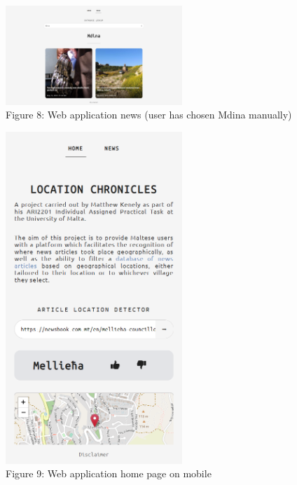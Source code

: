 \documentclass[a4paper, oneside, 11pt]{article}
\begin{document}
\begin{multicols*}{2}
  \begin{center}
    \includegraphics[width=0.5\textwidth]{./figures/newspagechoice.png} \\
    Figure 8: Web application news (user has chosen Mdina manually)
  \end{center}

  \begin{center}
    \includegraphics[width=0.5\textwidth]{./figures/mobilehome.png} \\
    Figure 9: Web application home page on mobile
  \end{center}


\end{multicols*}
\end{document}
